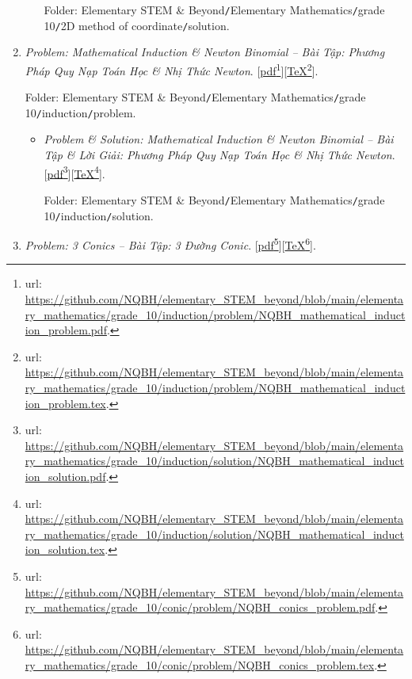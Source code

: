 \documentclass[12pt,twoside]{book}
\begin{document}
\begin{enumerate}
\begin{itemize}
		Folder: {\sf Elementary STEM \& Beyond{\tt/}Elementary Mathematics{\tt/}grade 10{\tt/}2D method of coordinate{\tt/}solution}.
	\end{itemize}
	\item {\it Problem: Mathematical Induction \& Newton Binomial -- Bài Tập: Phương Pháp Quy Nạp Toán Học \& Nhị Thức Newton}. [\href{https://github.com/NQBH/elementary_STEM_beyond/blob/main/elementary_mathematics/grade_10/induction/problem/NQBH_mathematical_induction_problem.pdf}{pdf}\footnote{{\sc url}: \url{https://github.com/NQBH/elementary_STEM_beyond/blob/main/elementary_mathematics/grade_10/induction/problem/NQBH_mathematical_induction_problem.pdf}.}][\href{https://github.com/NQBH/elementary_STEM_beyond/blob/main/elementary_mathematics/grade_10/induction/problem/NQBH_mathematical_induction_problem.tex}{\TeX}\footnote{{\sc url}: \url{https://github.com/NQBH/elementary_STEM_beyond/blob/main/elementary_mathematics/grade_10/induction/problem/NQBH_mathematical_induction_problem.tex}.}].
	
	Folder: {\sf Elementary STEM \& Beyond{\tt/}Elementary Mathematics{\tt/}grade 10{\tt/}induction{\tt/}problem}.
	\begin{itemize}
		\item {\it Problem \& Solution: Mathematical Induction \& Newton Binomial -- Bài Tập \& Lời Giải: Phương Pháp Quy Nạp Toán Học \& Nhị Thức Newton}. [\href{https://github.com/NQBH/elementary_STEM_beyond/blob/main/elementary_mathematics/grade_10/induction/solution/NQBH_mathematical_induction_solution.pdf}{pdf}\footnote{{\sc url}: \url{https://github.com/NQBH/elementary_STEM_beyond/blob/main/elementary_mathematics/grade_10/induction/solution/NQBH_mathematical_induction_solution.pdf}.}][\href{https://github.com/NQBH/elementary_STEM_beyond/blob/main/elementary_mathematics/grade_10/induction/solution/NQBH_mathematical_induction_solution.tex}{\TeX}\footnote{{\sc url}: \url{https://github.com/NQBH/elementary_STEM_beyond/blob/main/elementary_mathematics/grade_10/induction/solution/NQBH_mathematical_induction_solution.tex}.}].
		
		Folder: {\sf Elementary STEM \& Beyond{\tt/}Elementary Mathematics{\tt/}grade 10{\tt/}induction{\tt/}solution}.
	\end{itemize}
	\item {\it Problem: 3 Conics -- Bài Tập: 3 Đường Conic}. [\href{https://github.com/NQBH/elementary_STEM_beyond/blob/main/elementary_mathematics/grade_10/conic/problem/NQBH_conics_problem.pdf}{pdf}\footnote{{\sc url}: \url{https://github.com/NQBH/elementary_STEM_beyond/blob/main/elementary_mathematics/grade_10/conic/problem/NQBH_conics_problem.pdf}.}][\href{https://github.com/NQBH/elementary_STEM_beyond/blob/main/elementary_mathematics/grade_10/conic/problem/NQBH_conics_problem.tex}{\TeX}\footnote{{\sc url}: \url{https://github.com/NQBH/elementary_STEM_beyond/blob/main/elementary_mathematics/grade_10/conic/problem/NQBH_conics_problem.tex}.}].
	

\end{enumerate}
\end{document}
